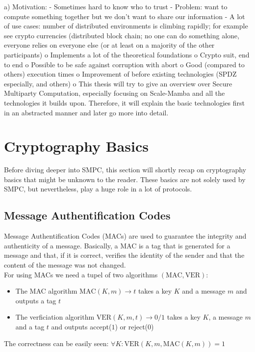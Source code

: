 \documentclass[english,runningheads,a4paper]{llncs}[2018/03/10]
\begin{document}
a)	Motivation: 
-	Sometimes hard to know who to trust 
-	Problem: want to compute something together but we don’t want to share our information
-	A lot of use cases: number of distributed environments is climbing rapidly; for example see crypto currencies (distributed block chain; no one can do something alone, everyone relies on everyone else (or at least on a majority of the other participants)
o	Implements a lot of the theoretical foundations
o	Crypto suit, end to end
o	Possible to be safe against corruption with abort
o	Good (compared to others) execution times
o	Improvement of before existing technologies (SPDZ especially, and others)
o	This thesis will try to give an overview over Secure Multiparty Computation, especially focusing on Scale-Mamba and all the technologies it builds upon. Therefore, it will explain the basic technologies first in an abstracted manner and later go more into detail. 




\section{Cryptography Basics}\label{sec:basics}

Before diving deeper into SMPC, this section will shortly recap on cryptography basics that might be unknown to the reader. These basics are not solely used by SMPC, but nevertheless, play a huge role in a lot of protocols.

\subsection{Message Authentification Codes}
Message Authentification Codes (MACs) are used to guarantee the integrity and authenticity of a message. Basically, a MAC is a tag that is generated for a message and that, if it is correct, verifies the identity of the sender and that the content of the message was not changed.\\
For using MACs we need a tupel of two algorithms \((\text{MAC},\text{VER})\):\\
\begin{itemize}
\item The MAC algorithm \(\text{MAC}(K,m)\rightarrow t\) takes a key \(K\) and a message \(m\) and outputs a tag \(t\)\\
\item The verficiation algorithm \(\text{VER}(K,m,t)\rightarrow 0/1\) takes a key \(K\), a message \(m\) and a tag \(t\) and outputs accept(\(1\)) or reject(\(0\))\\
\end{itemize}
The correctness can be easily seen: \(\forall K: \text{VER}(K,m,\text{MAC}(K,m))=1\)\\
\end{document}
